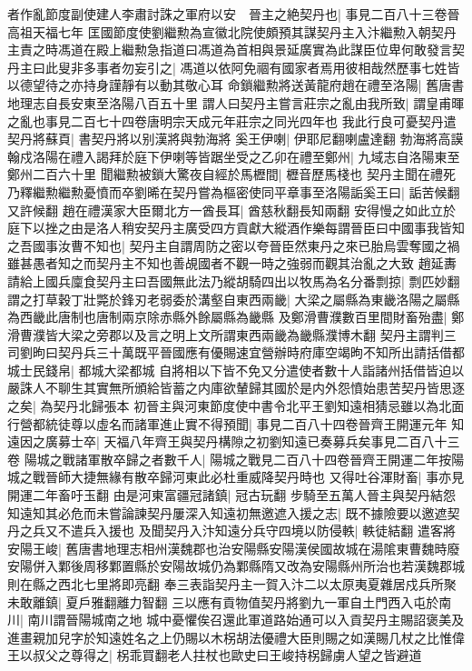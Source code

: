 者作亂節度副使建人李肅討誅之軍府以安　晉主之絶契丹也|{
	事見二百八十三卷晉高祖天福七年}
匡國節度使劉繼勲為宣徽北院使頗預其謀契丹主入汴繼勲入朝契丹主責之時馮道在殿上繼勲急指道曰馮道為首相與景延廣實為此謀臣位卑何敢發言契丹主曰此叟非多事者勿妄引之|{
	馮道以依阿免祻有國家者焉用彼相哉然歷事七姓皆以德望待之亦持身謹靜有以動其敬心耳}
命鎖繼勲將送黃龍府趙在禮至洛陽|{
	舊唐書地理志自長安東至洛陽八百五十里}
謂人曰契丹主嘗言莊宗之亂由我所致|{
	謂皇甫暉之亂也事見二百七十四卷唐明宗天成元年莊宗之同光四年也}
我此行良可憂契丹遣契丹將蘇頁|{
	書契丹將以别漢將與勃海將}
奚王伊喇|{
	伊耶尼翻喇盧達翻}
勃海將高謨翰戍洛陽在禮入謁拜於庭下伊喇等皆踞坐受之乙卯在禮至鄭州|{
	九域志自洛陽東至鄭州二百六十里}
聞繼勲被鎖大驚夜自經於馬櫪間|{
	櫪音歷馬棧也}
契丹主聞在禮死乃釋繼勲繼勲憂憤而卒劉晞在契丹嘗為樞密使同平章事至洛陽詬奚王曰|{
	詬苦候翻又許候翻}
趙在禮漢家大臣爾北方一酋長耳|{
	酋慈秋翻長知兩翻}
安得慢之如此立於庭下以挫之由是洛人稍安契丹主廣受四方貢獻大縱酒作樂每謂晉臣曰中國事我皆知之吾國事汝曹不知也|{
	契丹主自謂周防之密以夸晉臣然東丹之來已胎烏雲奪國之禍雖甚愚者知之而契丹主不知也善覘國者不觀一時之強弱而觀其治亂之大致}
趙延夀請給上國兵廩食契丹主曰吾國無此法乃縱胡騎四出以牧馬為名分番剽掠|{
	剽匹妙翻}
謂之打草穀丁壯斃於鋒刃老弱委於溝壑自東西兩畿|{
	大梁之屬縣為東畿洛陽之屬縣為西畿此唐制也唐制兩京除赤縣外餘屬縣為畿縣}
及鄭滑曹濮數百里間財畜殆盡|{
	鄭滑曹濮皆大梁之旁郡以及言之明上文所謂東西兩畿為畿縣濮博木翻}
契丹主謂判三司劉昫曰契丹兵三十萬既平晉國應有優賜速宜營辦時府庫空竭昫不知所出請括借都城士民錢帛|{
	都城大梁都城}
自將相以下皆不免又分遣使者數十人詣諸州括借皆迫以嚴誅人不聊生其實無所頒給皆蓄之内庫欲輦歸其國於是内外怨憤始患苦契丹皆思逐之矣|{
	為契丹北歸張本}
初晉主與河東節度使中書令北平王劉知遠相猜忌雖以為北面行營都統徒尊以虛名而諸軍進止實不得預聞|{
	事見二百八十四卷晉齊王開運元年}
知遠因之廣募士卒|{
	天福八年齊王與契丹構隙之初劉知遠已奏募兵矣事見二百八十三卷}
陽城之戰諸軍散卒歸之者數千人|{
	陽城之戰見二百八十四卷晉齊王開運二年按陽城之戰晉師大捷無緣有散卒歸河東此必杜重威降契丹時也}
又得吐谷渾財畜|{
	事亦見開運二年畜吁玉翻}
由是河東富疆冠諸鎮|{
	冠古玩翻}
步騎至五萬人晉主與契丹結怨知遠知其必危而未嘗論諫契丹屢深入知遠初無邀遮入援之志|{
	既不據險要以邀遮契丹之兵又不遣兵入援也}
及聞契丹入汴知遠分兵守四境以防侵軼|{
	軼徒結翻}
遣客將安陽王峻|{
	舊唐書地理志相州漢魏郡也治安陽縣安陽漢侯國故城在湯隂東曹魏時廢安陽併入鄴後周移鄴置縣於安陽故城仍為鄴縣隋又改為安陽縣州所治也若漢魏郡城則在縣之西北七里將即亮翻}
奉三表詣契丹主一賀入汴二以太原夷夏雜居戍兵所聚未敢離鎮|{
	夏戶雅翻離力智翻}
三以應有貢物值契丹將劉九一軍自土門西入屯於南川|{
	南川謂晉陽城南之地}
城中憂懼俟召還此軍道路始通可以入貢契丹主賜詔褒美及進畫親加兒字於知遠姓名之上仍賜以木柺胡法優禮大臣則賜之如漢賜几杖之比惟偉王以叔父之尊得之|{
	柺乖買翻老人拄杖也歐史曰王峻持柺歸虜人望之皆避道}
